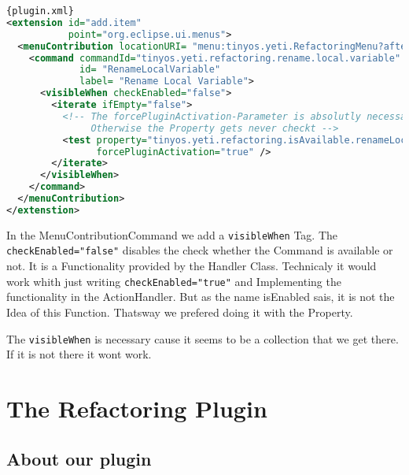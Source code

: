 \documentclass[a4paper,10pt]{report}
\begin{document}
\begin{lstlisting}[language=XML,caption=Visibility Condition ({\it plugin.xml})]{plugin.xml}
<extension id="add.item"
           point="org.eclipse.ui.menus">
  <menuContribution locationURI= "menu:tinyos.yeti.RefactoringMenu?after=additions">
    <command commandId="tinyos.yeti.refactoring.rename.local.variable"
             id= "RenameLocalVariable"
             label= "Rename Local Variable">
      <visibleWhen checkEnabled="false">
        <iterate ifEmpty="false">
          <!-- The forcePluginActivation-Parameter is absolutly necessary. 
               Otherwise the Property gets never checkt -->
          <test property="tinyos.yeti.refactoring.isAvailable.renameLocalVariable"
                forcePluginActivation="true" />
        </iterate>
      </visibleWhen>
    </command>
  </menuContribution>
</extenstion>
\end{lstlisting}
In the MenuContributionCommand we add a \verb!visibleWhen! Tag. The \verb!checkEnabled="false"! disables the check whether the Command is available or not. 
It is a Functionality provided by the Handler Class. Technicaly it would work whith just writing \verb!checkEnabled="true"! and Implementing the functionality in 
the ActionHandler. But as the name isEnabled sais, it is not the Idea of this Function. Thatsway we prefered doing it with the Property.

The \verb!visibleWhen! is necessary cause it seems to be a collection that we get there. If it is not there it wont work.

\part{The Refactoring Plugin}
\chapter{About our plugin}
\end{document}
